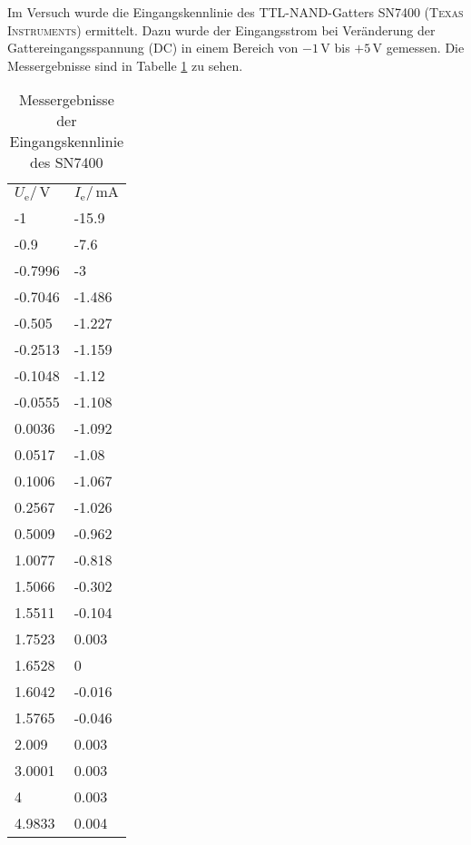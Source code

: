 Im Versuch wurde die Eingangskennlinie des TTL-NAND-Gatters SN7400 (\textsc{Texas Instruments}) ermittelt.
Dazu wurde der Eingangsstrom bei Veränderung der Gattereingangsspannung (DC)
in einem Bereich von $-1 \, \si{\volt}$ bis $+5 \, \si{\volt}$ gemessen. Die Messergebnisse sind in Tabelle \ref{tab:sn7400ein} zu sehen.

\vspace{\parskip}

\begin{table}[h]
\begin{center}
\begin{tabular}{ll}
\rowcolor{gray0} 
$U_\mathrm{e} / \, \si{\volt}$ & $I_\mathrm{e} / \,\si{\milli\ampere}$ \\
-1                    & -15.9                        \\
-0.9                  & -7.6                         \\
-0.7996               & -3                           \\
-0.7046               & -1.486                       \\
-0.505                & -1.227                       \\
-0.2513               & -1.159                       \\
-0.1048               & -1.12                        \\
-0.0555               & -1.108                       \\
0.0036                & -1.092                       \\
0.0517                & -1.08                        \\
0.1006                & -1.067                       \\
0.2567                & -1.026                       \\
0.5009                & -0.962                       \\
1.0077                & -0.818                       \\
1.5066                & -0.302                       \\
1.5511                & -0.104                       \\
1.7523                & 0.003                        \\
1.6528                & 0                            \\
1.6042                & -0.016                       \\
1.5765                & -0.046                       \\
2.009                 & 0.003                        \\
3.0001                & 0.003                        \\
4                     & 0.003                        \\
4.9833                & 0.004                       
\end{tabular}
\end{center}
\caption{Messergebnisse der Eingangskennlinie des SN7400}
\label{tab:sn7400ein}
\end{table}

